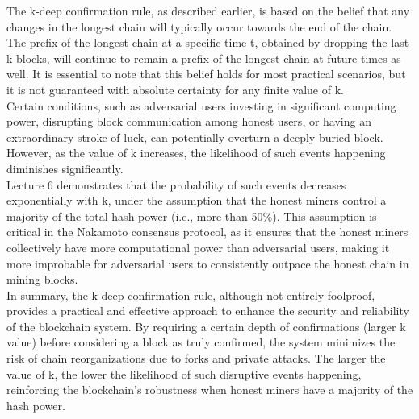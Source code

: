 \documentclass{report}
\begin{document}
The k-deep confirmation rule, as described earlier, is based on the belief that any changes in the longest chain will typically occur towards the end of the chain. The prefix of the longest chain at a specific time t, obtained by dropping the last k blocks, will continue to remain a prefix of the longest chain at future times as well. It is essential to note that this belief holds for most practical scenarios, but it is not guaranteed with absolute certainty for any finite value of k.\\
Certain conditions, such as adversarial users investing in significant computing power, disrupting block communication among honest users, or having an extraordinary stroke of luck, can potentially overturn a deeply buried block. However, as the value of k increases, the likelihood of such events happening diminishes significantly.\\
Lecture 6 demonstrates that the probability of such events decreases exponentially with k, under the assumption that the honest miners control a majority of the total hash power (i.e., more than 50\%). This assumption is critical in the Nakamoto consensus protocol, as it ensures that the honest miners collectively have more computational power than adversarial users, making it more improbable for adversarial users to consistently outpace the honest chain in mining blocks.\\
In summary, the k-deep confirmation rule, although not entirely foolproof, provides a practical and effective approach to enhance the security and reliability of the blockchain system. By requiring a certain depth of confirmations (larger k value) before considering a block as truly confirmed, the system minimizes the risk of chain reorganizations due to forks and private attacks. The larger the value of k, the lower the likelihood of such disruptive events happening, reinforcing the blockchain's robustness when honest miners have a majority of the hash power.\\
\end{document}
